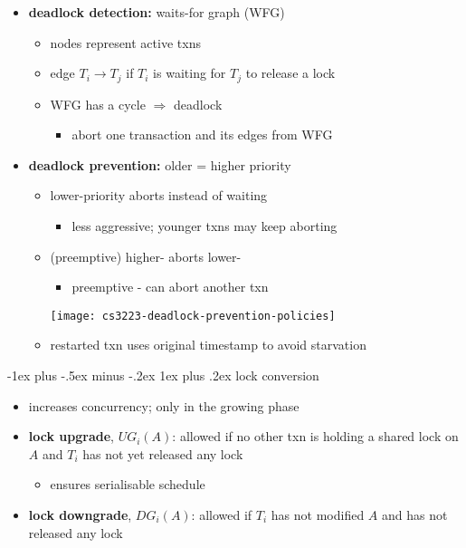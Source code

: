 \documentclass[10pt, landscape]{article}
\makeatletter
\renewcommand{\subsubsection}{\@startsection{subsubsection}{3}{0mm}%
  {-1ex plus -.5ex minus -.2ex}%
  {1ex plus .2ex}%
{\normalfont\small\bfseries}}%
\makeatother
\begin{document}
\begin{multicols*}{4}
  \begin{itemize}
    \item \textbf{deadlock detection:} waits-for graph (WFG)
          \begin{itemize}
            \item nodes represent active txns
            \item edge $T_i \to T_j$ if $T_i$ is waiting for $T_j$ to release a lock
            \item WFG has a cycle $\Rightarrow$ deadlock
                  \begin{itemize}
                    \item abort one transaction and its edges from WFG
                  \end{itemize}
          \end{itemize}
    \item \textbf{deadlock prevention:} older = higher priority
          \begin{itemize}
            \item {} lower-priority aborts instead of waiting
                  \begin{itemize}
                    \item less aggressive; younger txns may keep aborting
                  \end{itemize}
            \item {} (preemptive) higher- aborts lower-
                  \begin{itemize}
                    \item preemptive - can abort another txn
                  \end{itemize}
                  \texttt{[image: cs3223-deadlock-prevention-policies]}
            \item restarted txn uses original timestamp to avoid starvation
          \end{itemize}
  \end{itemize}

  \subsubsection{lock conversion}

  \begin{itemize}
    \item increases concurrency; only in the growing phase
    \item \textbf{lock upgrade}, $UG_i(A)$: allowed if no other txn is holding a shared lock on $A$ and $T_i$ has not yet released any lock
          \begin{itemize}
            \item ensures serialisable schedule
          \end{itemize}
    \item \textbf{lock downgrade}, $DG_i(A)$: allowed if $T_i$ has not modified $A$ and has not released any lock
  \end{itemize}


\end{multicols*}
\end{document}

